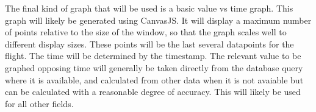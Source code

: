 \documentclass[onecolumn, draftclsnofoot, 10pt, compsoc]{IEEEtran}
\begin{document}
The final kind of graph that will be used is a basic value vs time graph. This graph will likely be generated using CanvasJS. It will display a maximum number of points relative to the size of the window, so that the graph scales well to different display sizes. These points will be the last several datapoints for the flight. The time will be determined by the timestamp. The relevant value to be graphed opposing time will generally be taken directly from the database query where it is available, and calculated from other data when it is not avaiable but can be calculated with a reasonable degree of accuracy. This will likely be used for all other fields.



\end{document}
